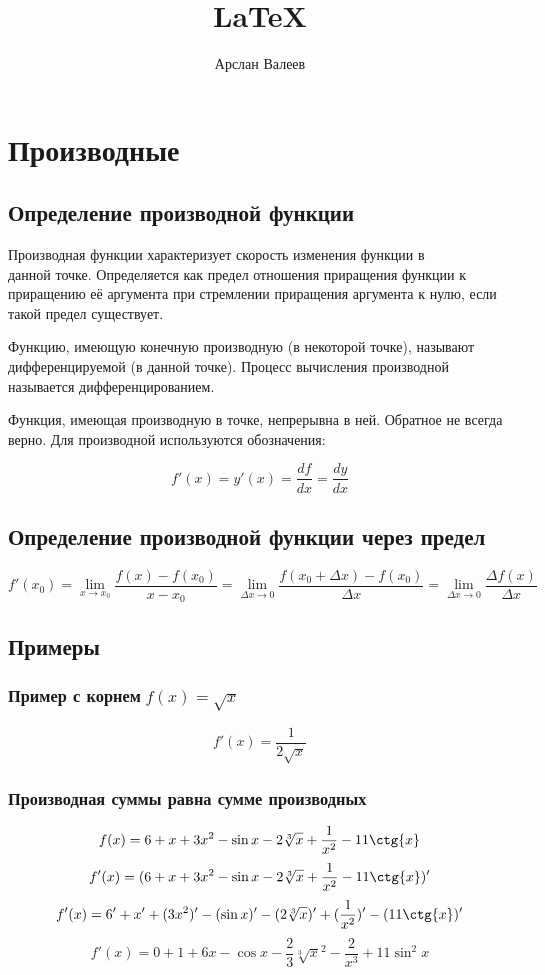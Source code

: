 \documentclass[12pt,a4paper]{article}
\title{\LaTeX}
\date{}
\author{Арслан Валеев}
\begin{document}
  

\section{Производные}
\subsection{Определение производной функции}
Производная функции характеризует скорость изменения функции в \\ данной точке. Определяется как предел отношения приращения функции к приращению её аргумента при стремлении приращения аргумента к нулю, если такой предел существует.

Функцию, имеющую конечную производную (в некоторой точке), называют дифференцируемой (в данной точке). Процесс вычисления производной называется дифференцированием.

Функция, имеющая производную в точке, непрерывна в ней. Обратное не всегда верно.
Для производной используются обозначения:

$$f'(x)=y'(x)=\frac{df}{dx}=\frac{dy}{dx}$$

\subsection{Определение производной функции через предел}

$$f'(x_0)
= \lim_{x \to x_0}\frac{f(x)-f(x_0)}{x-x_0}
= \lim_{\Delta x \to 0}\frac{f(x_0+ \Delta x)-f(x_0)}{\Delta x}
= \lim_{\Delta x \to 0}\frac{\Delta f(x)}{\Delta x}
$$

\subsection{Примеры}

\subsubsection{Пример с корнем$\;f(x)=\sqrt{x}$}
$$f'(x)=\frac{1}{2\sqrt{x}}$$
\subsubsection{Производная суммы равна сумме производных}
$$f(x)=6+x+3x^2-\sin{x}-2\sqrt[3]{x}+\frac{1}{x^2}-11\ctg{x}$$
$$f'(x)=(6+x+3x^2-\sin{x}-2\sqrt[3]{x}+\frac{1}{x^2}-11\ctg{x})'$$
$$f'(x)= 6'+x'+(3x^2)'-(\sin{x})'-(2\sqrt[3]{x})'+(\frac{1}{x^2})'-(11\ctg{x})'$$
$$f'(x)= 0+1+6x-\cos{x}-\frac{2}{3}\sqrt[3]x^2-\frac{2}{x^3}+11\sin^2{x}$$
\end{document}
